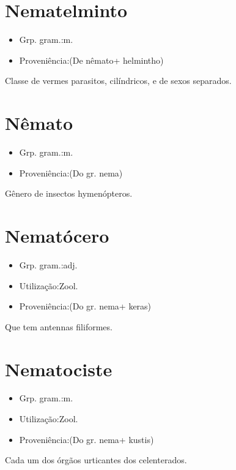 \section{Nematelminto}
\begin{itemize}
\item {Grp. gram.:m.}
\end{itemize}
\begin{itemize}
\item {Proveniência:(De \textunderscore nêmato\textunderscore  + \textunderscore helmintho\textunderscore )}
\end{itemize}
Classe de vermes parasitos, cilíndricos, e de sexos separados.
\section{Nêmato}
\begin{itemize}
\item {Grp. gram.:m.}
\end{itemize}
\begin{itemize}
\item {Proveniência:(Do gr. \textunderscore nema\textunderscore )}
\end{itemize}
Gênero de insectos hymenópteros.
\section{Nematócero}
\begin{itemize}
\item {Grp. gram.:adj.}
\end{itemize}
\begin{itemize}
\item {Utilização:Zool.}
\end{itemize}
\begin{itemize}
\item {Proveniência:(Do gr. \textunderscore nema\textunderscore  + \textunderscore keras\textunderscore )}
\end{itemize}
Que tem antennas filiformes.
\section{Nematociste}
\begin{itemize}
\item {Grp. gram.:m.}
\end{itemize}
\begin{itemize}
\item {Utilização:Zool.}
\end{itemize}
\begin{itemize}
\item {Proveniência:(Do gr. \textunderscore nema\textunderscore  + \textunderscore kustis\textunderscore )}
\end{itemize}
Cada um dos órgãos urticantes dos celenterados.
